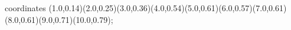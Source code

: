 					coordinates { (1.0,0.14)(2.0,0.25)(3.0,0.36)(4.0,0.54)(5.0,0.61)(6.0,0.57)(7.0,0.61)(8.0,0.61)(9.0,0.71)(10.0,0.79)};